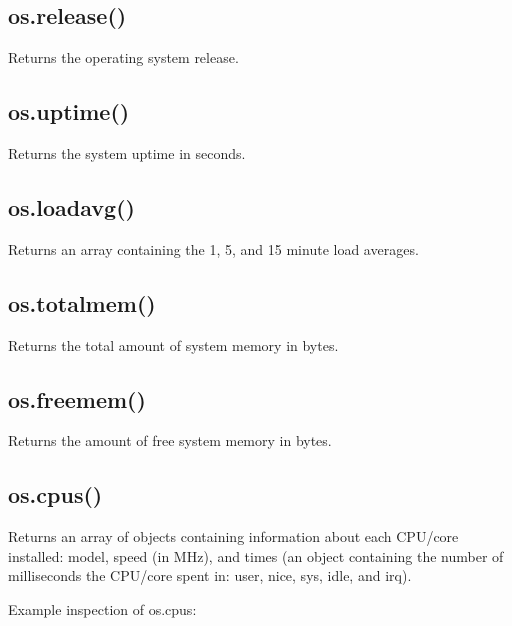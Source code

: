 \subsection{os.release()}

Returns the operating system release.

\subsection{os.uptime()}

Returns the system uptime in seconds.

\subsection{os.loadavg()}

Returns an array containing the 1, 5, and 15 minute load averages.

\subsection{os.totalmem()}

Returns the total amount of system memory in bytes.

\subsection{os.freemem()}

Returns the amount of free system memory in bytes.

\subsection{os.cpus()}

Returns an array of objects containing information about each CPU/core
installed: model, speed (in MHz), and times (an object containing the
number of milliseconds the CPU/core spent in: user, nice, sys, idle, and
irq).

Example inspection of os.cpus:

